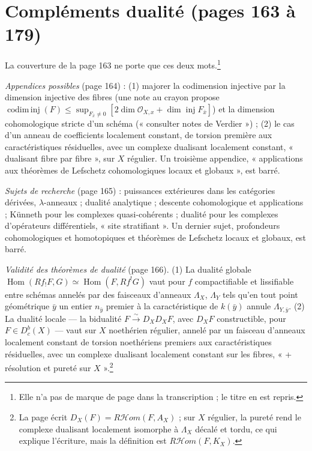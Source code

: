 \documentclass[11pt,a4paper]{article}
\begin{document}
\section*{Compléments dualité (pages 163 à 179)}

La couverture de la page 163 ne porte que ces deux mots.\footnote{Elle n'a pas
de marque de page dans la transcription ; le titre en est repris.}

\emph{Appendices possibles} (page 164) : (1) majorer la codimension injective par
la dimension injective des fibres (une note au crayon propose
$\operatorname{codim\,inj}(F) \leq \sup_{F_{\bar x} \neq 0}[2\dim
\mathcal{O}_{X,x} + \dim\operatorname{inj}F_{\bar x}]$) et la dimension
cohomologique stricte d'un schéma (« consulter notes de Verdier ») ; (2) le cas
d'un anneau de coefficients localement constant, de torsion première aux
caractéristiques résiduelles, avec un complexe dualisant localement constant,
« dualisant fibre par fibre », sur $X$ régulier. Un troisième appendice,
« applications aux théorèmes de Lefschetz cohomologiques locaux et globaux »,
est barré.

\emph{Sujets de recherche} (page 165) : puissances extérieures dans les
catégories dérivées, $\lambda$-anneaux ; dualité analytique ; descente
cohomologique et applications ; Künneth pour les complexes quasi-cohérents ;
dualité pour les complexes d'opérateurs différentiels, « site stratifiant ».
Un dernier sujet, profondeurs cohomologiques et homotopiques et théorèmes de
Lefschetz locaux et globaux, est barré.

\emph{Validité des théorèmes de dualité} (page 166). (1) La dualité globale
$\operatorname{Hom}(Rf_{!}F, G) \simeq \operatorname{Hom}(F, Rf^{!}G)$ vaut pour
$f$ compactifiable et lissifiable entre schémas annelés par des faisceaux
d'anneaux $\Lambda_{X}$, $\Lambda_{Y}$ tels qu'en tout point géométrique $\bar
y$ un entier $n_{\bar y}$ premier à la caractéristique de $k(\bar y)$ annule
$\Lambda_{Y,\bar y}$. (2) La dualité locale --- la bidualité $F
\xrightarrow{\sim} D_{X}D_{X}F$, avec $D_{X}F$ constructible, pour $F \in
D^{b}_{c}(X)$ --- vaut sur $X$ noethérien régulier, annelé par un faisceau
d'anneaux localement constant de torsion noethériens premiers aux
caractéristiques résiduelles, avec un complexe dualisant localement constant
sur les fibres, « + résolution et pureté sur $X$ ».\footnote{La page écrit
$D_{X}(F) = R\mathcal{H}om(F, A_{X})$ ; sur $X$ régulier, la pureté rend le
complexe dualisant localement isomorphe à $\Lambda_{X}$ décalé et tordu, ce qui
explique l'écriture, mais la définition est $R\mathcal{H}om(F, K_{X})$.}
\end{document}
